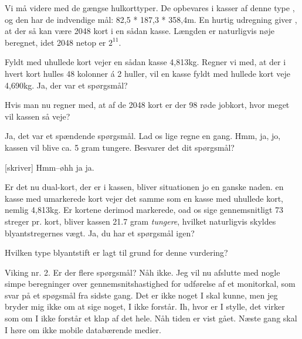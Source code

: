 \documentclass[a4paper,11pt]{article}
\begin{document}
\begin{sketch}
 Vi må videre med de gængse hulkorttyper.  De opbevares i
kasser af denne type , og den har de indvendige
mål: 82,5 * 187,3 * 358,4m.  En hurtig udregning giver , at der så kan være 2048 kort i en sådan kasse.  Længden er
naturligvis nøje beregnet, idet 2048 netop er $2^{11}$.

 Fyldt med uhullede kort vejer en sådan kasse 4,813kg.  Regner
vi med, at der i hvert kort hulles 48 kolonner á 2 huller, vil en
kasse fyldt med hullede kort veje 4,690kg.  Ja, der var et spørgsmål?

 Hvis man nu regner med, at af de 2048 kort er der 98 røde
jobkort, hvor meget vil kassen så veje?

 Ja, det var et spændende spørgsmål.  Lad os lige regne en
gang.  Hmm, ja, jo, kassen vil blive ca. 5 gram tungere.  Besvarer det
dit spørgsmål?

[skriver] Hmm--øhh ja ja.

 Er det nu dual-kort, der er i kassen, bliver situationen jo
en ganske naden.  en kasse med umarkerede kort vejer det samme som en
kasse med uhullede kort, nemlig 4,813kg.  Er kortene derimod
markerede, oad os sige gennemsnitligt 73 streger pr. kort, bliver
kassen 21.7 gram {\em tungere}, hvilket naturligvis skyldes
blyantstregernes vægt.  Ja, du har et spørgsmål igen?

 Hvilken type blyantstift er lagt til grund for denne
vurdering?

 Viking nr. 2.  Er der flere spørgsmål?  Nåh ikke.  Jeg vil nu
afslutte med nogle simpe beregninger over gennemsnitshastighed for
udførelse af et monitorkal, som svar på et spøgsmål fra sidste gang.
Det er ikke noget I skal kunne, men jeg bryder mig ikke om at sige
noget, I ikke forstår.  Ih, hvor er I stylle, det virker som om I
ikke forstår et klap af det hele.  Nåh tiden er vist gået.  Næste gang
skal I høre om ikke mobile databærende medier.
\end{sketch}
\end{document}

